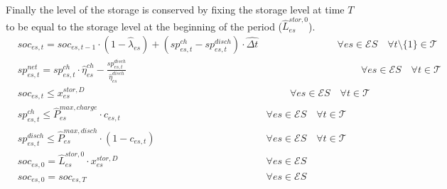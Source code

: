 \documentclass{article}
\newcommand{\cT}{{\mathcal T}}
\newcommand{\cES}{{\mathcal ES}}
\begin{document}
{Finally the level of the storage is conserved by fixing the storage level at time $T$ to be equal to the storage level at the beginning of the period ($\hat{L}_{es}^{stor,0}$). 
		\begin{align}
		& soc_{es,t} = soc_{es,t-1} \cdot (1-\hat{\lambda}_{es}) + (sp_{es,t}^{ch} - sp_{es,t}^{disch}) \cdot \hat{\Delta t}  & \hspace{3cm} \forall es \in \cES \quad \forall t \setminus\{1\} \in \cT \label{eq:Soc}\\
		& sp_{es,t}^{net} = sp_{es,t}^{ch} \cdot \hat{\eta}_{es}^{ch} - \frac{sp_{es,t}^{disch}}{\hat{\eta}_{es}^{disch}} & \hspace{4cm} \forall es \in \cES \quad \forall t \in \cT \label{eq:sp_net}\\
		& soc_{es,t} \leq x_{es}^{stor, D} &\hspace{1cm} \forall es \in \cES \quad \forall t \in \cT \label{eq:Stor_capacity}\\
		& sp_{es,t}^{ch} \leq \hat{P}_{es}^{max, charge} \cdot c_{es,t} & \forall es \in \cES \quad \forall t \in \cT \label{eq:Stor_maxCharge}\\
		& sp_{es,t}^{disch} \leq \hat{P}_{es}^{max, disch} \cdot (1-c_{es,t}) & \forall es \in \cES \quad \forall t \in \cT \label{eq:Stor_maxDisch}\\
		& soc_{es,0} = \hat{L}_{es}^{stor,0} \cdot x_{es}^{stor, D} &\forall es \in \cES \label{eq: Stor_init}\\
		& soc_{es,0} = soc_{es, T} &\forall es \in \cES \label{eq:Stor_boundaries}
		\end{align}
\begin{comment}
		\begin{align}
		& l_{es,t}^{stor} - l_{es,t-1}^{stor} \cdot (1-\hat{\lambda}_{es}) = l_{es,t}^{charge} \cdot \hat{\eta}_{es}^{ch} - l_{es,t}^{disch} \cdot \frac{1}{\hat{\eta}_{es}^{disch}}  & \hspace{4cm} \forall es \in \cES \quad \forall t \in \cT \label{eq:Stor_level}\\
		& l_{es,t}^{stor} \leq x_{es}^{stor, D} &\hspace{1cm} \forall es \in \cES \quad \forall t \in \cT \label{eq:Stor_capacity}\\
		& l_{es,t}^{charge} \leq \hat{P}_{es}^{max, charge} \cdot \Delta t & \forall es \in \cES \quad \forall t \setminus\{1\} \in \cT \label{eq:Stor_maxCharge}\\
		& l_{es,t}^{disch} \leq \hat{P}_{es}^{max, disch} \cdot \Delta t & \forall es \in \cES \quad \forall t \setminus\{1\} \in \cT \label{eq:Stor_maxDisch}\\

\end{comment}}
\end{document}
